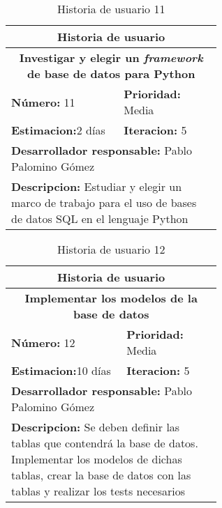 \begin{table}[H]
        \centering
        \begin{tabular}{|p{0.3\linewidth}|p{0.3\linewidth}|}
          \hline
          \multicolumn{2}{|c|}{Historia de usuario}\\ \hline
          \multicolumn{2}{|c|}{\textbf{Investigar y elegir un \textit{framework} de base de datos para Python}}\\ \hline
          \textbf{Número:} 11 & \textbf{Prioridad:} Media\\ \hline
          \textbf{Estimacion:}2 días & \textbf{Iteracion:} 5\\ \hline
          \multicolumn{2}{|l|}{\textbf{Desarrollador responsable:} Pablo Palomino Gómez}\\ \hline
          \multicolumn{2}{|p{0.6\linewidth}|}{\textbf{Descripcion:} Estudiar y elegir un marco de trabajo para el uso de bases de datos SQL en el lenguaje Python}\\ \hline
        \end{tabular}
        \caption{Historia de usuario 11}
        \label{tab:hist11}
\end{table}
\begin{table}[H]
        \centering
        \begin{tabular}{|p{0.3\linewidth}|p{0.3\linewidth}|}
          \hline
          \multicolumn{2}{|c|}{Historia de usuario}\\ \hline
          \multicolumn{2}{|c|}{\textbf{Implementar los modelos de la base de datos}}\\ \hline
          \textbf{Número:} 12 & \textbf{Prioridad:} Media\\ \hline
          \textbf{Estimacion:}10 días & \textbf{Iteracion:} 5\\ \hline
          \multicolumn{2}{|l|}{\textbf{Desarrollador responsable:} Pablo Palomino Gómez}\\ \hline
          \multicolumn{2}{|p{0.6\linewidth}|}{\textbf{Descripcion:} Se deben definir las tablas que contendrá la base de datos. Implementar los modelos de dichas tablas, crear la base de datos con las tablas y realizar los tests necesarios}\\ \hline
        \end{tabular}
        \caption{Historia de usuario 12}
        \label{tab:hist12}
\end{table}
